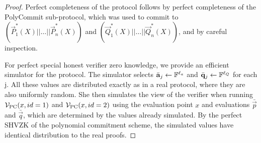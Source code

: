 \begin{proof}
Perfect completeness of the protocol follows by perfect completeness of the PolyCommit sub-protocol, which was used to commit to $\left( \vec{P}_1^*(X)||\ldots||\vec{P}_n^*(X)\right)$ and $\left( \vec{Q}_1^*(X)||\ldots||\vec{Q}_n^*(X)\right)$, and by careful inspection.

For perfect special honest verifier zero knowledge, we provide an efficient simulator for the protocol. The simulator selects $\bar{\mathbf{a}}_j \gets \mathbb{F}^{\ell_a}$ and $\bar{\mathbf{q}}_j\gets \mathbb{F}^{\ell_Q}$ for each j. All these values are distributed exactly as in a real protocol, where they are also uniformly random. She then simulates the view of the verifier when running $\mathcal{V}_\mathrm{PC}(x,id=1)$ and $\mathcal{V}_\mathrm{PC}(x,id=2)$ using the evaluation point $x$ and evaluations $\bar{\vec{p}}$ and $\bar{\vec{q}}$, which are determined by the values already simulated. By the perfect SHVZK of the polynomial commitment scheme, the simulated values have identical distribution to the real proofs.


\end{proof}

